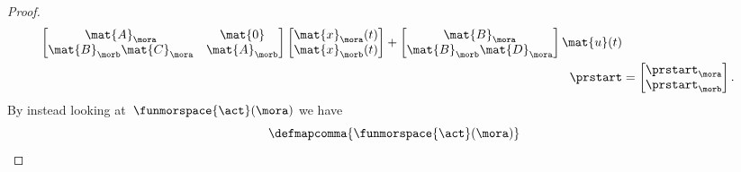 \begin{proof}
\begin{equation}
\begin{aligned}
\begin{bmatrix}
                                                  \mat{A}_\mora              & \mat{0}       \\
                                                  \mat{B}_\morb\mat{C}_\mora & \mat{A}_\morb
                                              \end{bmatrix} \begin{bmatrix}
                                                                \mat{x}_\mora(t) \\
                                                                \mat{x}_\morb(t)
                                                            \end{bmatrix}+\begin{bmatrix}
                                                                              \mat{B}_\mora \\
                                                                              \mat{B}_\morb\mat{D}_\mora
                                                                          \end{bmatrix}\mat{u}(t) \\
            \prstart                                  & =
            \begin{bmatrix}
                \prstart_\mora \\
                \prstart_\morb
            \end{bmatrix}.
        \end{aligned}
    \end{equation}
    By instead looking at~$\funmorspace{\act}(\mora)$ we have
    \begin{equation}
        \defmapcomma{\funmorspace{\act}(\mora)}

\end{equation}
\end{proof}
